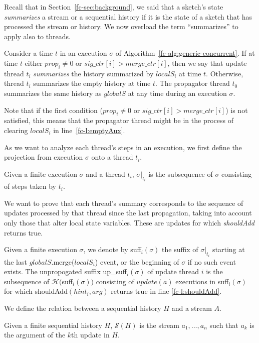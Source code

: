 Recall that in Section~\ref{fc-sec:background}, we said that a sketch's state \emph{summarizes} a
stream or a sequential history if it is the state of a sketch that has processed
the stream or history. We now overload the term ``summarizes'' to apply also to threads.
\begin{definition}
    Consider a time $t$ in an execution $\sigma$ of Algorithm~\ref{fc-alg:generic-concurrent}. If at time $t$ either $prop_i \neq 0$
    or $sig\_ctr[i]>merge\_ctr[i]$, then we say that update thread $t_i$ \emph{summarizes} the history
    summarized by $localS_i$ at time $t$. Otherwise, thread $t_i$ summarizes the empty history at time $t$.
    The propagator thread $t_0$ summarizes the same history as $globalS$ at any time during an execution $\sigma$.
\label{fc-def:thread-summary}
\end{definition}
Note that if the first condition ($prop_i \neq 0$ or $sig\_ctr[i]>merge\_ctr[i]$) is not satisfied,
this means that the propagator thread might be in the process of clearing $localS_i$ in line~\ref{fc-l:emptyAux}.


As we want to analyze each thread's steps in an execution, we first define the projection from
execution $\sigma$ onto a thread $t_i$.
\begin{definition}[Projection]
    Given a finite execution $\sigma$ and a thread $t_i$, $\sigma\Bigr|_{t_i}$ is the subsequence of
    $\sigma$ consisting of steps taken by $t_i$.
\end{definition}

We want to prove that each thread's summary corresponds to the sequence of updates
processed by that thread since the last propagation, taking
into account only those that alter local state variables. These are updates for which \emph{shouldAdd} returns
true.
\begin{definition}
    Given a finite execution $\sigma$, we denote by suff$_i(\sigma)$ the suffix of $\sigma \Bigr|_{t_i}$ starting 
    at the last $globalS$.merge($localS_i$) event, or the beginning of $\sigma$ if no such event exists. 
    The unpropogated suffix up\_suff$_i(\sigma)$ of update thread $i$ is 
    the subsequence of $\mathcal{H} ($suff$_i(\sigma))$ consisting of $update(a)$ executions in suff$_i(\sigma)$ for which
    shouldAdd$(hint_i, arg)$ returns true in line \ref{fc-l:shouldAdd}.
    \label{fc-def:unpropogated-suffix}
\end{definition}

We define the relation between a sequential history $H$ and a stream $A$.
\begin{definition}
    Given a finite sequential history $H$, ${\mathcal{S}}(H)$ is the stream $a_1,\dots,a_n$ such that $a_k$
    is the argument of the $k$th update in $H$.
\end{definition}

